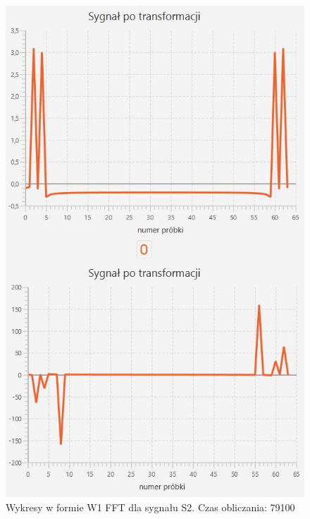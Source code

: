 \documentclass[12pt]{article}
\begin{document}
\begin{figure}[H]
	\centering
	\includegraphics[width=.8\linewidth]{FFT-S2-W1}
	\caption{Wykresy w formie W1 FFT dla sygnału S2. Czas obliczania: 79100}
	\label{S3_sygnal}
\end{figure}
\end{document}
